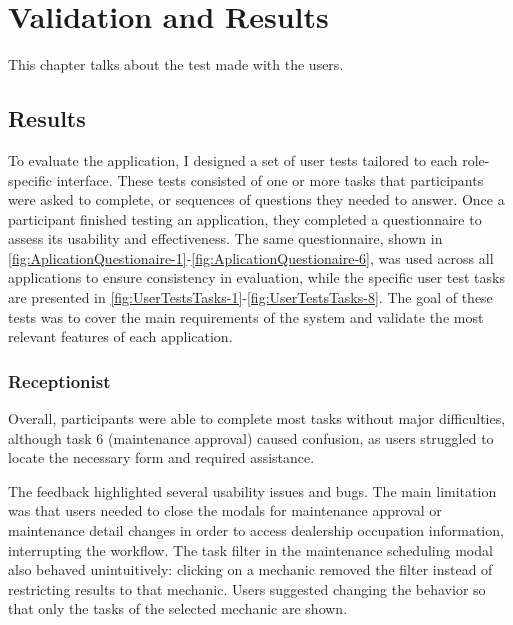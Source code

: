 \chapter{Validation and Results}%
\label{chapter:ValidationandResults}

\begin{introduction}
This chapter talks about the test made with the users.
\end{introduction} 


\section{Results}


To evaluate the application, I designed a set of user tests tailored to each role-specific interface. These tests consisted of one or more tasks that participants were asked to complete, or sequences of questions they needed to answer. Once a participant finished testing an application, they completed a questionnaire to assess its usability and effectiveness. The same questionnaire, shown in \ref{fig:AplicationQuestionaire-1}-\ref{fig:AplicationQuestionaire-6}, was used across all applications to ensure consistency in evaluation, while the specific user test tasks are presented in \ref{fig:UserTestsTasks-1}-\ref{fig:UserTestsTasks-8}. The goal of these tests was to cover the main requirements of the system and validate the most relevant features of each application.

\subsection{Receptionist}
Overall, participants were able to complete most tasks without major difficulties, although task 6 (maintenance approval) caused confusion, as users struggled to locate the necessary form and required assistance.

The feedback highlighted several usability issues and bugs. The main limitation was that users needed to close the modals for maintenance approval or maintenance detail changes in order to access dealership occupation information, interrupting the workflow. The task filter in the maintenance scheduling modal also behaved unintuitively: clicking on a mechanic removed the filter instead of restricting results to that mechanic. Users suggested changing the behavior so that only the tasks of the selected mechanic are shown.


